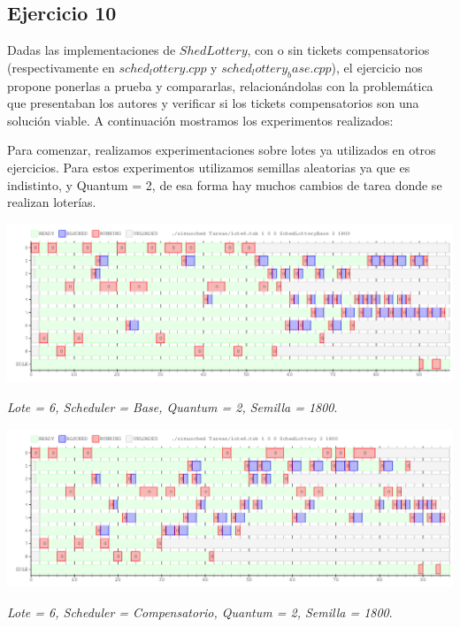 
\subsection{Ejercicio 10}

Dadas las implementaciones de $ShedLottery$, con o sin tickets compensatorios (respectivamente en $sched_lottery.cpp$ y $sched_lottery_base.cpp$), el ejercicio nos propone ponerlas a prueba y compararlas, relacion\'andolas con la problem\'atica que presentaban los autores y verificar si los tickets compensatorios son una soluci\'on viable. A continuaci\'on mostramos los experimentos realizados:

\vspace{2mm}

Para comenzar, realizamos experimentaciones sobre lotes ya utilizados en otros ejercicios. Para estos experimentos utilizamos semillas aleatorias ya que es indistinto, y Quantum = 2, de esa forma hay muchos cambios de tarea donde se realizan loter\'ias.

\includegraphics[width=1\textwidth]{./Graficos/Ej10/testBase.png}
\begin{center}
 \textit{Lote = 6, Scheduler = Base, Quantum = 2, Semilla = 1800}.
\end{center}


\includegraphics[width=1\textwidth]{./Graficos/Ej10/testComp.png}
\begin{center}
 \textit{Lote = 6, Scheduler = Compensatorio, Quantum = 2, Semilla = 1800}.
\end{center}


